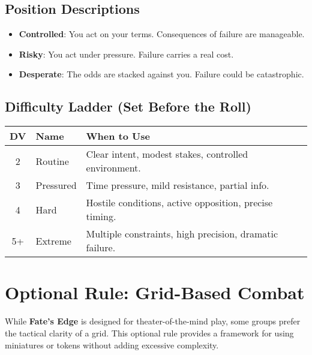 \subsection*{Position Descriptions}

\begin{itemize}
    \item \textbf{Controlled}: You act on your terms. Consequences of failure are manageable.
    \item \textbf{Risky}: You act under pressure. Failure carries a real cost.
    \item \textbf{Desperate}: The odds are stacked against you. Failure could be catastrophic.
\end{itemize}

\subsection*{Difficulty Ladder (Set Before the Roll)}

\begin{center}
\begin{tabular}{cll}
\toprule
\textbf{DV} & \textbf{Name} & \textbf{When to Use} \\
\midrule
2 & Routine\index{Difficulty Value!Routine} & Clear intent, modest stakes, controlled environment. \\
3 & Pressured\index{Difficulty Value!Pressured} & Time pressure, mild resistance, partial info. \\
4 & Hard\index{Difficulty Value!Hard} & Hostile conditions, active opposition, precise timing. \\
5+ & Extreme\index{Difficulty Value!Extreme} & Multiple constraints, high precision, dramatic failure. \\
\bottomrule
\end{tabular}
\end{center}

\section*{Optional Rule: Grid-Based Combat}

While \textbf{Fate's Edge} is designed for theater-of-the-mind play, some groups prefer the tactical clarity of a grid. This optional rule provides a framework for using miniatures or tokens without adding excessive complexity.

